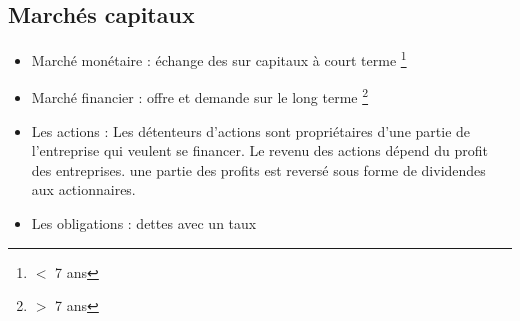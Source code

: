 \subsection{Marchés capitaux}
\begin{itemize}
    \item \textcolor{BrickRed}{Marché monétaire} : échange des sur capitaux à court terme \footnote{$<$ 7 ans}
    \item \textcolor{BrickRed}{Marché financier} : offre et demande sur le long terme \footnote{$>$ 7 ans}
    \item \textcolor{BrickRed}{Les actions} : Les détenteurs d'actions sont propriétaires d'une partie de l'entreprise qui veulent se financer. Le revenu des actions dépend du profit des entreprises. une partie des profits est reversé sous forme de dividendes aux actionnaires.
    \item \textcolor{BrickRed}{Les obligations} : dettes avec un taux
\end{itemize}